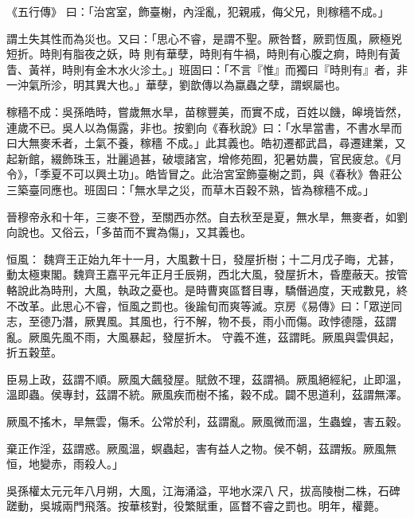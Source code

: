 
\begin{pinyinscope}

 《五行傳》
 曰：「治宮室，飾臺榭，內淫亂，犯親戚，侮父兄，則稼穡不成。」



 謂土失其性而為災也。又曰：「思心不睿，是謂不聖。厥咎瞀，厥罰恆風，厥極兇短折。時則有脂夜之妖，時
 則有華孽，時則有牛禍，時則有心腹之痾，時則有黃眚、黃祥，時則有金木水火沴土。」班固曰：「不言『惟』而獨曰『時則有』者，非一沖氣所沴，明其異大也。」華孽，劉歆傳以為蠃蟲之孽，謂螟屬也。



 稼穡不成：吳孫皓時，嘗歲無水旱，苗稼豐美，而實不成，百姓以饑，皞境皆然，連歲不已。吳人以為傷露，非也。按劉向《春秋說》曰：「水旱當書，不書水旱而曰大無麥禾者，土氣不養，稼穡
 不成。」此其義也。皓初遷都武昌，尋遷建業，又起新館，綴飾珠玉，壯麗過甚，破壞諸宮，增修苑囿，犯暑妨農，官民疲怠。《月令》，「季夏不可以興土功」。皓皆冒之。此治宮室飾臺榭之罰，與《春秋》魯莊公三築臺同應也。班固曰：「無水旱之災，而草木百穀不熟，皆為稼穡不成。」



 晉穆帝永和十年，三麥不登，至關西亦然。自去秋至是夏，無水旱，無麥者，如劉向說也。又俗云，「多苗而不實為傷」，又其義也。



 恒風：
 魏齊王正始九年十一月，大風數十日，發屋折樹；十二月戊子晦，尤甚，動太極東閣。魏齊王嘉平元年正月壬辰朔，西北大風，發屋折木，昏塵蔽天。按管輅說此為時刑，大風，執政之憂也。是時曹爽區瞀目專，驕僭過度，天戒數見，終不改革。此思心不睿，恒風之罰也。後踰旬而爽等滅。京房《易傳》曰：「眾逆同志，至德乃潛，厥異風。其風也，行不解，物不長，雨小而傷。政悖德隱，茲謂亂。厥風先風不雨，大風暴起，發屋折木。
 守義不進，茲謂眊。厥風與雲俱起，折五穀莖。



 臣易上政，茲謂不順。厥風大飆發屋。賦斂不理，茲謂禍。厥風絕經紀，止即溫，溫即蟲。侯專封，茲謂不統。厥風疾而樹不搖，穀不成。闢不思道利，茲謂無澤。



 厥風不搖木，旱無雲，傷禾。公常於利，茲謂亂。厥風微而溫，生蟲蝗，害五穀。



 棄正作淫，茲謂惑。厥風溫，螟蟲起，害有益人之物。侯不朝，茲謂叛。厥風無恒，地變赤，雨殺人。」



 吳孫權太元元年八月朔，大風，江海涌溢，平地水深八
 尺，拔高陵樹二株，石碑蹉動，吳城兩門飛落。按華核對，役繁賦重，區瞀不睿之罰也。明年，權薨。




\end{pinyinscope}
